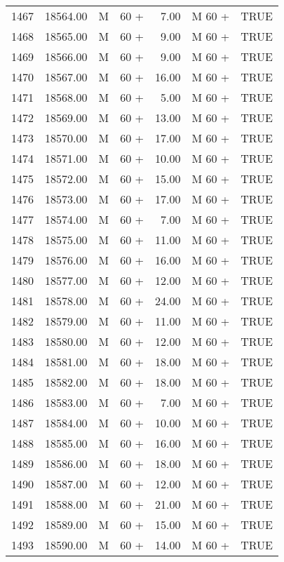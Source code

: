 \begin{table}[ht]
\begin{tabular}{rrllrll}
  1467 & 18564.00 & M & 60 + & 7.00 & M 60 + & TRUE \\ 
  1468 & 18565.00 & M & 60 + & 9.00 & M 60 + & TRUE \\ 
  1469 & 18566.00 & M & 60 + & 9.00 & M 60 + & TRUE \\ 
  1470 & 18567.00 & M & 60 + & 16.00 & M 60 + & TRUE \\ 
  1471 & 18568.00 & M & 60 + & 5.00 & M 60 + & TRUE \\ 
  1472 & 18569.00 & M & 60 + & 13.00 & M 60 + & TRUE \\ 
  1473 & 18570.00 & M & 60 + & 17.00 & M 60 + & TRUE \\ 
  1474 & 18571.00 & M & 60 + & 10.00 & M 60 + & TRUE \\ 
  1475 & 18572.00 & M & 60 + & 15.00 & M 60 + & TRUE \\ 
  1476 & 18573.00 & M & 60 + & 17.00 & M 60 + & TRUE \\ 
  1477 & 18574.00 & M & 60 + & 7.00 & M 60 + & TRUE \\ 
  1478 & 18575.00 & M & 60 + & 11.00 & M 60 + & TRUE \\ 
  1479 & 18576.00 & M & 60 + & 16.00 & M 60 + & TRUE \\ 
  1480 & 18577.00 & M & 60 + & 12.00 & M 60 + & TRUE \\ 
  1481 & 18578.00 & M & 60 + & 24.00 & M 60 + & TRUE \\ 
  1482 & 18579.00 & M & 60 + & 11.00 & M 60 + & TRUE \\ 
  1483 & 18580.00 & M & 60 + & 12.00 & M 60 + & TRUE \\ 
  1484 & 18581.00 & M & 60 + & 18.00 & M 60 + & TRUE \\ 
  1485 & 18582.00 & M & 60 + & 18.00 & M 60 + & TRUE \\ 
  1486 & 18583.00 & M & 60 + & 7.00 & M 60 + & TRUE \\ 
  1487 & 18584.00 & M & 60 + & 10.00 & M 60 + & TRUE \\ 
  1488 & 18585.00 & M & 60 + & 16.00 & M 60 + & TRUE \\ 
  1489 & 18586.00 & M & 60 + & 18.00 & M 60 + & TRUE \\ 
  1490 & 18587.00 & M & 60 + & 12.00 & M 60 + & TRUE \\ 
  1491 & 18588.00 & M & 60 + & 21.00 & M 60 + & TRUE \\ 
  1492 & 18589.00 & M & 60 + & 15.00 & M 60 + & TRUE \\ 
  1493 & 18590.00 & M & 60 + & 14.00 & M 60 + & TRUE \\ 

\end{tabular}
\end{table}
